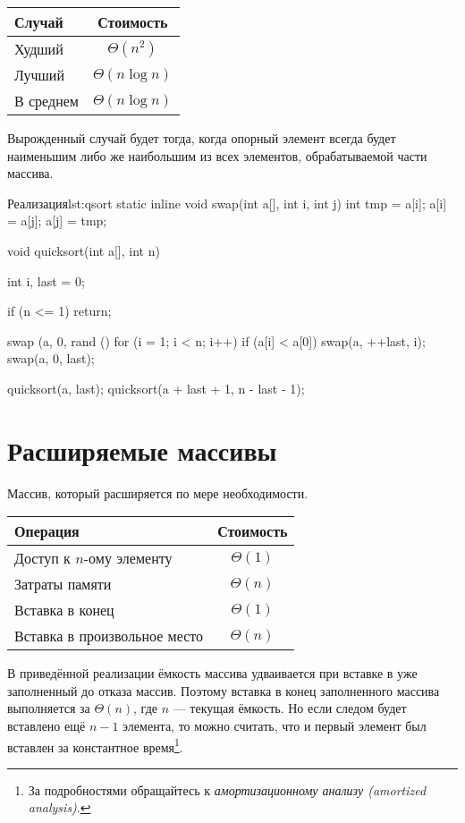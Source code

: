 \begin{center}
  \begin{tabular}{lc}
    \toprule
    Случай & Стоимость \\
    \midrule
    Худший & $\Theta(n^2)$ \\
    Лучший & $\Theta(n \log n)$ \\
    В среднем & $\Theta(n \log n)$ \\
    \bottomrule
  \end{tabular}
\end{center}

Вырожденный случай будет тогда, когда опорный элемент всегда будет наименьшим либо же наибольшим из всех элементов, обрабатываемой части массива.

\begin{clst}{Реализация}{lst:qsort}
static inline void swap(int a[], int i, int j)
{
    int tmp = a[i];
    a[i] = a[j];
    a[j] = tmp;
}

void quicksort(int a[], int n)
{
    int i, last = 0;

    if (n <= 1)
        return;

    swap (a, 0, rand () %
    for (i = 1; i < n; i++)
        if (a[i] < a[0])
            swap(a, ++last, i);
    swap(a, 0, last);

    quicksort(a, last);
    quicksort(a + last + 1, n - last - 1);
}
\end{clst}

\section{Расширяемые массивы}
\label{sec:ext-arrays}

Массив, который расширяется по мере необходимости.
\begin{center}
  \begin{tabular}{lc}
    \toprule
    Операция & Стоимость \\
    \midrule
    Доступ к $n$-ому элементу & $\Theta(1)$ \\
    Затраты памяти & $\Theta(n)$ \\
    Вставка в конец & $\Theta(1)$ \\
    Вставка в произвольное место & $\Theta(n)$ \\
    \bottomrule
  \end{tabular}
\end{center}

В приведённой реализации ёмкость массива удваивается при вставке в уже заполненный до отказа массив. Поэтому вставка в конец заполненного массива выполняется за $\Theta(n)$, где $n$ — текущая ёмкость. Но если следом будет вставлено ещё $n - 1$ элемента, то можно считать, что и первый элемент был вставлен за константное время\footnote{За подробностями обращайтесь к \emph{амортизационному анализу (amortized analysis)}.}.


